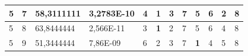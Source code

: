 \documentclass[conference]{IEEEtran}
\begin{document}
\begin{table}[]
\begin{tabular}{|llll|llllllll|}
\multicolumn{1}{|l|}{5}                                                     & \multicolumn{1}{l|}{7}                                                        & \multicolumn{1}{l|}{58,3111111}                                                   & 3,2783E-10                     & \multicolumn{1}{l|}{4}                                                  & \multicolumn{1}{l|}{\textbf{1}}                                         & \multicolumn{1}{l|}{3}                                                  & \multicolumn{1}{l|}{7}                                                  & \multicolumn{1}{l|}{5}                                                  & \multicolumn{1}{l|}{6}                                                  & \multicolumn{1}{l|}{2}                                                  & 8                          \\ \hline
\multicolumn{1}{|l|}{5}                                                     & \multicolumn{1}{l|}{8}                                                        & \multicolumn{1}{l|}{63,8444444}                                                   & 2,566E-11                      & \multicolumn{1}{l|}{3}                                                  & \multicolumn{1}{l|}{\textbf{1}}                                         & \multicolumn{1}{l|}{2}                                                  & \multicolumn{1}{l|}{7}                                                  & \multicolumn{1}{l|}{5}                                                  & \multicolumn{1}{l|}{6}                                                  & \multicolumn{1}{l|}{4}                                                  & 8                          \\ \hline
\multicolumn{1}{|l|}{5}                                                     & \multicolumn{1}{l|}{9}                                                        & \multicolumn{1}{l|}{51,3444444}                                                   & 7,86E-09                       & \multicolumn{1}{l|}{6}                                                  & \multicolumn{1}{l|}{2}                                                  & \multicolumn{1}{l|}{3}                                                  & \multicolumn{1}{l|}{7}                                                  & \multicolumn{1}{l|}{\textbf{1}}                                         & \multicolumn{1}{l|}{4}                                                  & \multicolumn{1}{l|}{5}                                                  & 8                          \\ \hline

\end{tabular}
\end{table}
\end{document}
